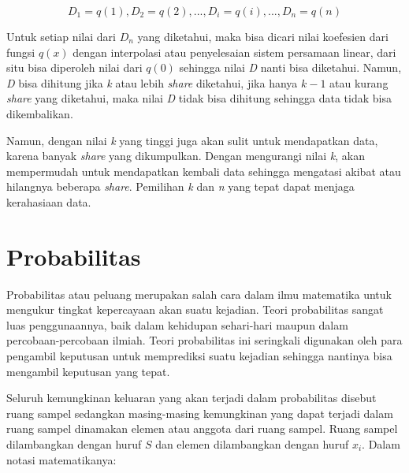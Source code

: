 \begin{displaymath}
	D_1 = q(1), D_2 = q(2), ... , D_i = q(i), ... , D_n = q(n)
\end{displaymath}

Untuk setiap nilai dari \begin{math}D_n\end{math} yang diketahui, maka bisa dicari nilai koefesien dari fungsi \begin{math}q(x)\end{math} dengan interpolasi atau penyelesaian sistem persamaan linear, dari situ bisa diperoleh nilai dari \begin{math}q(0)\end{math} sehingga nilai \textit{D} nanti bisa diketahui. Namun, \textit{D} bisa dihitung jika \textit{k} atau lebih \textit{share} diketahui, jika hanya \begin{math}k-1\end{math} atau kurang \textit{share} yang diketahui, maka nilai \textit{D} tidak bisa dihitung sehingga data tidak bisa dikembalikan.

Namun, dengan nilai \textit{k} yang tinggi juga akan sulit untuk mendapatkan data, karena banyak \textit{share} yang dikumpulkan. Dengan mengurangi nilai \textit{k}, akan mempermudah untuk mendapatkan kembali data sehingga mengatasi akibat atau hilangnya beberapa \textit{share}. Pemilihan \textit{k} dan \textit{n} yang tepat dapat menjaga kerahasiaan data.

\section{Probabilitas}
Probabilitas atau peluang merupakan salah cara dalam ilmu matematika untuk mengukur tingkat kepercayaan akan suatu kejadian. Teori probabilitas sangat luas penggunaannya, baik dalam kehidupan sehari-hari maupun dalam percobaan-percobaan ilmiah. Teori probabilitas ini seringkali digunakan oleh para pengambil keputusan untuk memprediksi suatu kejadian sehingga nantinya bisa mengambil keputusan yang tepat.

Seluruh kemungkinan keluaran yang akan terjadi dalam probabilitas disebut ruang sampel sedangkan masing-masing kemungkinan yang dapat terjadi dalam ruang sampel dinamakan elemen atau anggota dari ruang sampel. Ruang sampel dilambangkan dengan huruf \begin{math}S\end{math} dan elemen dilambangkan dengan huruf \begin{math}x_i\end{math}. Dalam notasi matematikanya:

